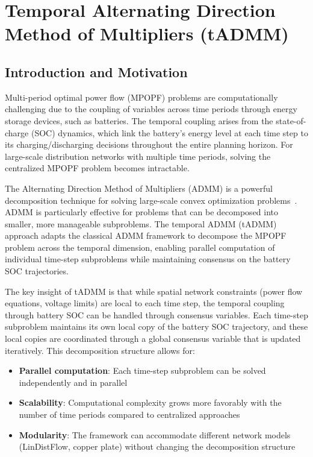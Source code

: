 \clearpage
\section{Temporal Alternating Direction Method of Multipliers (tADMM)}

\subsection{Introduction and Motivation}

Multi-period optimal power flow (MPOPF) problems are computationally challenging due to the coupling of variables across time periods through energy storage devices, such as batteries. The temporal coupling arises from the state-of-charge (SOC) dynamics, which link the battery's energy level at each time step to its charging/discharging decisions throughout the entire planning horizon. For large-scale distribution networks with multiple time periods, solving the centralized MPOPF problem becomes intractable.

The Alternating Direction Method of Multipliers (ADMM) is a powerful decomposition technique for solving large-scale convex optimization problems~\cite{admm_boyd_website, admm_cmu_notes}. ADMM is particularly effective for problems that can be decomposed into smaller, more manageable subproblems. The temporal ADMM (tADMM) approach adapts the classical ADMM framework to decompose the MPOPF problem across the temporal dimension, enabling parallel computation of individual time-step subproblems while maintaining consensus on the battery SOC trajectories.

The key insight of tADMM is that while spatial network constraints (power flow equations, voltage limits) are local to each time step, the temporal coupling through battery SOC can be handled through consensus variables. Each time-step subproblem maintains its own local copy of the battery SOC trajectory, and these local copies are coordinated through a global consensus variable that is updated iteratively. This decomposition structure allows for:
\begin{itemize}
    \item \textbf{Parallel computation}: Each time-step subproblem can be solved independently and in parallel
    \item \textbf{Scalability}: Computational complexity grows more favorably with the number of time periods compared to centralized approaches
    \item \textbf{Modularity}: The framework can accommodate different network models (LinDistFlow, copper plate) without changing the decomposition structure
\end{itemize}

